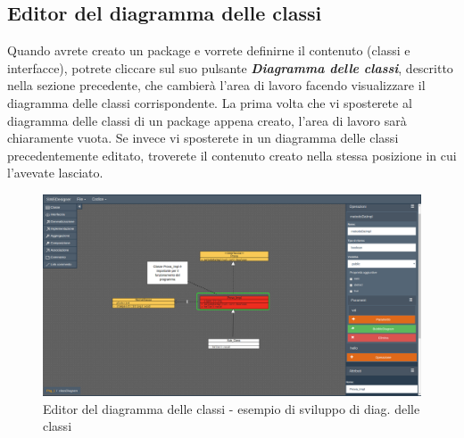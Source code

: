 \documentclass[../ManualeUtente.tex]{subfiles}
\begin{document}
		\subsection{Editor del diagramma delle classi}
			Quando avrete creato un package e vorrete definirne il contenuto (classi e interfacce), potrete cliccare
			sul suo pulsante \textit{\textbf{Diagramma delle classi}}, descritto nella sezione precedente, che
			cambierà l'area di lavoro facendo visualizzare il diagramma delle classi corrispondente. La prima volta che
			vi sposterete al diagramma delle classi di un package appena creato, l'area di lavoro sarà chiaramente vuota.
			Se invece vi sposterete in un diagramma delle classi precedentemente editato, troverete il contenuto
			creato nella stessa posizione in cui l'avevate lasciato.
			\begin{figure} [h!]
				\centering
				\includegraphics[scale=0.24]{./Immagini/ClassDiagram.png}
				\caption{Editor del diagramma delle classi - esempio di sviluppo di diag. delle classi}\label{fig:ClassDiagram}
			\end{figure}
\end{document}
